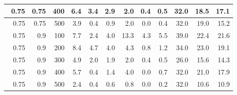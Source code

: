 \begin{longtable}{|r|r|r|r|r|r|r|r|r|r|r|r|}
        \hline \
        0.75                           & 0.75                     & 400                       & 6.4                       & 3.4                       & 2.9                       & 2.0                      & 0.4                       & 0.5                       & 32.0                      & 18.5                      & 17.1                      \\
        \hline \
        0.75                           & 0.75                     & 500                       & 3.9                       & 0.4                       & 0.9                       & 2.0                       & 0.0                       & 0.4                       & 32.0                      & 19.0                      & 15.2                      \\
        \hline \
        0.75                           & 0.9                     & 100                       & 7.7                       & 2.4                       & 4.0                       & 13.3                       & 4.3                       & 5.5                       & 39.0                      & 22.4                      & 21.6                      \\
        \hline \
        0.75                           & 0.9                     & 200                       & 8.4                       & 4.7                       & 4.0                       & 4.3                       & 0.8                       & 1.2                       & 34.0                      & 23.0                      & 19.1                      \\
        \hline \
        0.75                           & 0.9                     & 300                       & 4.9                       & 2.0                       & 1.9                       & 2.0                       & 0.4                       & 0.5                       & 26.0                      & 15.6                      & 14.3                      \\
        \hline \
        0.75                            & 0.9                     & 400                       & 5.7                      & 0.4                       & 1.4                       & 4.0                      & 0.0                      & 0.7                      & 32.0                      & 21.0                      & 17.9                      \\
        \hline \
        0.75                            & 0.9                     & 500                       & 2.4                      & 0.4                       & 0.6                       & 0.8                      & 0.0                       & 0.2                       & 32.0                      & 10.6                      & 10.9                      \\

\end{longtable}
